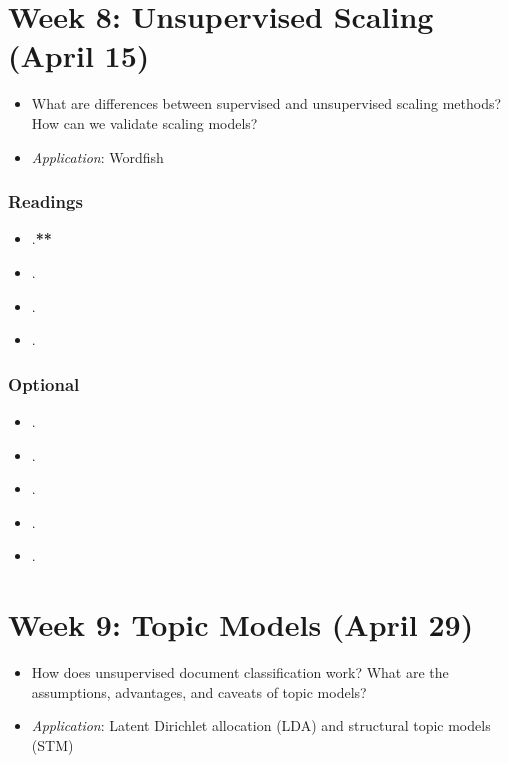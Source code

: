 \documentclass[abstract=on,parskip=full,headings=standardclasses,fontsize=11pt,paper=a4]{scrartcl}
\begin{document}
\section{Week 8: Unsupervised Scaling (April 15)}

\begin{itemize}
\renewcommand\labelitemi{--}
\item What are differences between supervised and unsupervised scaling methods? How can we validate scaling models?
\item \textit{Application}: Wordfish
\end{itemize}

\subsubsection*{Readings}
\begin{itemize}
\item {}.\textbf{**}
\item {}.
\item {}.
\item {}.
\end{itemize}

\subsubsection*{Optional}
\begin{itemize}
\item {}.
\item {}.
\item {}.
\item {}.
\item {}.
\end{itemize}


\section{Week 9: Topic Models (April 29)}

\begin{itemize}
\renewcommand\labelitemi{--}
\item How does unsupervised document classification work? What are the assumptions, advantages, and caveats of topic models? 
\item \textit{Application}: Latent Dirichlet allocation (LDA) and structural topic models (STM)
\end{itemize}
\end{document}
